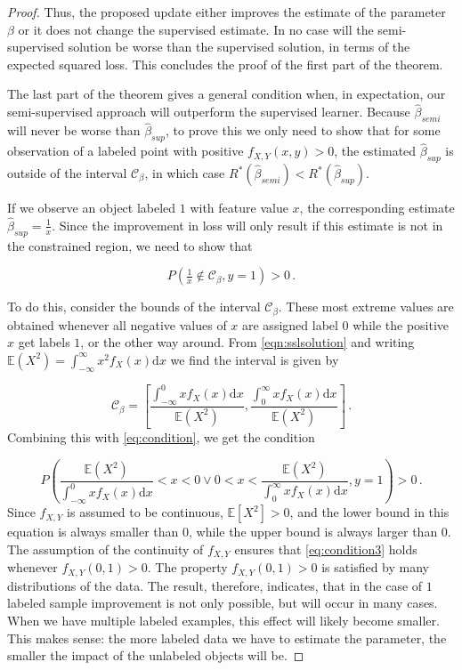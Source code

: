 \documentclass[twoside]{memoir}\usepackage[]{graphicx}\usepackage{xcolor}
\newcommand{\Cb}{\mathcal{C}_{\beta}}
\begin{document}
\begin{proof}
Thus, the proposed update either improves the estimate of the parameter $\beta$ or it does not change the supervised estimate. In no case will the semi-supervised solution be worse than the supervised solution, in terms of the expected squared loss. This concludes the proof of the first part of the theorem.

The last part of the theorem gives a general condition when, in expectation, our semi-supervised approach will outperform the supervised learner. Because $\hat{\beta}_{semi}$ will never be worse than $\hat{\beta}_{sup}$, to prove this we only need to show that for some observation of a labeled point with positive $f_{X,Y}(x,y)>0$, the estimated $\hat{\beta}_{sup}$ is outside of the interval $\Cb$, in which case $R^*(\hat{\beta}_{semi}) < R^*(\hat{\beta}_{sup})$. 

If we observe an object labeled $1$ with feature value $x$, the corresponding estimate $\hat{\beta}_{sup}=\tfrac{1}{x}$. Since the improvement in loss will only result if this estimate is not in the constrained region, we need to show that

\begin{equation} \label{eq:condition}
P(\tfrac{1}{x} \notin \Cb,y=1)>0 \, .
\end{equation}

To do this, consider the bounds of the interval $\Cb$. These most extreme values are obtained whenever all negative values of $x$ are assigned label $0$ while the positive $x$ get labels $1$, or the other way around. From \eqref{eqn:sslsolution} and writing $\mathbb{E}(X^2)=\int_{-\infty}^{\infty} { x^2 f_X(x) \mathrm{d}x}$ we find the interval is given by

\begin{equation} \label{eq:condition2}
\Cb=\left[ \frac{\int_{-\infty}^{0}{x f_X(x) \mathrm{d}x }}{\mathbb{E}(X^2)},\frac{\int_{0}^{\infty}{x f_X(x)  \mathrm{d}x }}{\mathbb{E}(X^2)} \right] \, .
\end{equation}
Combining this with \eqref{eq:condition}, we get the condition

\begin{equation} \label{eq:condition3}
P \left( \frac{\mathbb{E}(X^2)}{\int_{-\infty}^{0}{x f_X(x)  \mathrm{d}x }} < x < 0 \vee 0 < x < \frac{\mathbb{E}(X^2)}{\int_{0}^{\infty}{x f_X(x)  \mathrm{d}x }},y=1 \right) > 0 \, .
\end{equation}
Since $f_{X,Y}$ is assumed to be continuous, $\mathbb{E}[X^2]>0$, and the lower bound in this equation is always smaller than $0$, while the upper bound is always larger than $0$. The assumption of the continuity of $f_{X,Y}$ ensures that  \eqref{eq:condition3} holds whenever $f_{X,Y}(0,1)>0$.  The property $f_{X,Y}(0,1)>0$ is satisfied by many distributions of the data. The result, therefore, indicates, that in the case of $1$ labeled sample improvement is not only possible, but will occur in many cases. When we have multiple labeled examples, this effect will likely become smaller. This makes sense: the more labeled data we have to estimate the parameter, the smaller the impact of the unlabeled objects will be. \hfill
\end{proof}
\end{document}
